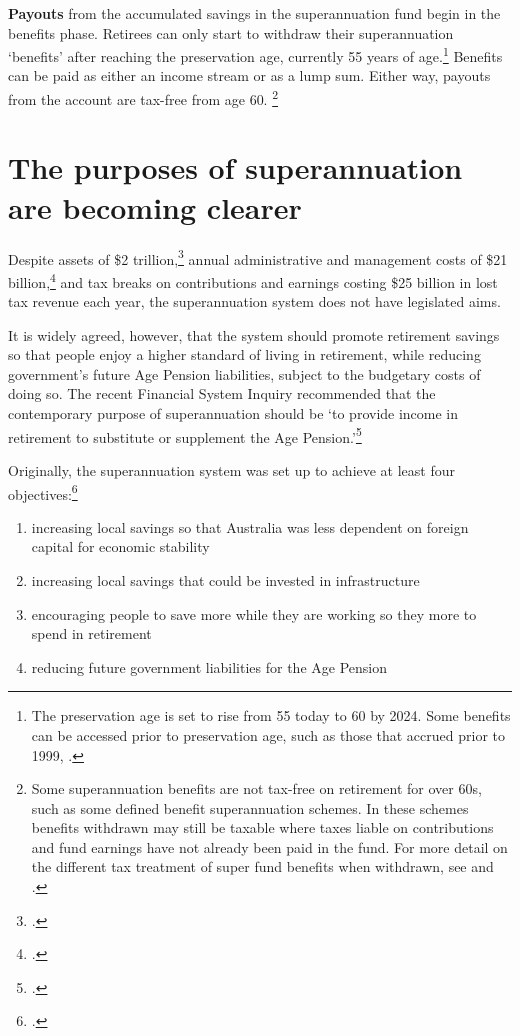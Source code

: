  \textbf{Payouts} from the accumulated savings in the superannuation fund begin in the benefits phase.  Retirees can only start to withdraw their superannuation ‘benefits’ after reaching the preservation age, currently 55 years of age.\footnote{The preservation age is set to rise from 55 today to 60 by 2024. Some benefits can be accessed prior to preservation age, such as those that accrued prior to 1999, \textcite{ATO2015WhenYouCanAccessYourSuper}.} Benefits can be paid as either an income stream or as a lump sum. Either way, payouts from the account are tax-free from age 60.%
 \footnote{Some superannuation benefits are not tax-free on retirement for over 60s, such as some defined benefit superannuation schemes. In these schemes benefits withdrawn may still be taxable where taxes liable on contributions and fund earnings have not already been paid in the fund. For more detail on the different tax treatment of super fund benefits when withdrawn, see \textcite{ATO2015HowTaxAppliesToSuper} and \textcite[][13]{Mercer2015SubmissionToReThink}.}

 \section{The purposes of superannuation are becoming clearer}
 Despite assets of \$2 trillion,\footcite{APRA2015JuneSuperPerformance} annual administrative and management costs of \$21 billion,\footcite{MinifieSavageCameron2015} and tax breaks on contributions and earnings costing \$25 billion in lost tax revenue each year, the superannuation system does not have legislated aims. 

It is widely agreed, however, that the system should promote retirement savings so that people enjoy a higher standard of living in retirement, while reducing government’s future Age Pension liabilities, subject to the budgetary costs of doing so. The recent Financial System Inquiry recommended that the contemporary purpose of superannuation should be ‘to provide income in retirement to substitute or supplement the Age Pension.’\footcite[][95]{FinancialSystemsInquiry2015}

 Originally, the superannuation system was set up to achieve at least four objectives:\footcite{Greenwood2010}
 \begin{enumerate}
\item increasing local savings so that Australia was less dependent on foreign capital for economic stability
\item increasing local savings that could be invested in infrastructure
\item encouraging people to save more while they are working so they more to spend in retirement
\item reducing future government liabilities for the Age Pension
 \end{enumerate}

